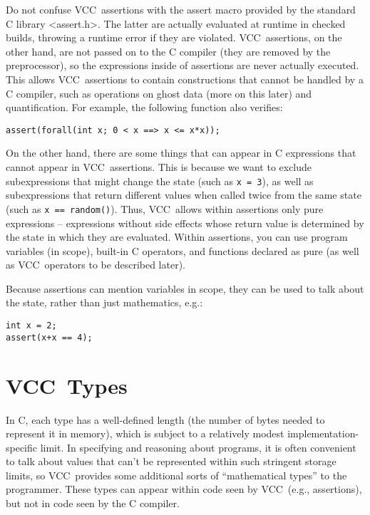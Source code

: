 \documentclass{report}
\newcommand{\Q}[1]{\lstinline~#1~}
\newcommand{\VCC}{VCC}
\begin{document}
Do not confuse \VCC\ assertions with the assert macro provided by the
standard C library <assert.h>. The latter are actually evaluated at
runtime in checked builds, throwing a runtime error if they are
violated. \VCC\ assertions, on the other hand, are not passed on to the
C compiler (they are removed by the preprocessor), so the expressions
inside of assertions are never actually executed. This allows \VCC\
assertions to contain constructions that cannot be handled by a C
compiler, such as operations on ghost data (more on this later) and
quantification. For example, the following function also verifies:
\begin{lstlisting}
assert(forall(int x; 0 < x ==> x <= x*x));
\end{lstlisting}

On the other hand, there are some things that can appear in C
expressions that cannot appear in \VCC\ assertions. This is because we
want to exclude subexpressions that might change the state (such as \Q{x
= 3}), as well as subexpressions that return different values when
called twice from the same state (such as \Q{x == random()}). Thus, \VCC\
allows within assertions only pure expressions -- expressions without
side effects whose return value is determined by the state in which
they are evaluated. Within assertions, you can use program variables
(in scope), built-in C operators, and functions declared as pure (as
well as \VCC\ operators to be described later).

Because assertions can mention variables in scope, they can be used to
talk about the state, rather than just mathematics, e.g.:

\begin{lstlisting}
int x = 2;
assert(x+x == 4);
\end{lstlisting}

\section{\VCC\ Types}

In C, each type has a well-defined length (the number of bytes needed
to represent it in memory), which is subject to a relatively modest
implementation-specific limit. In specifying and reasoning about
programs, it is often convenient to talk about values that can't be
represented within such stringent storage limits, so \VCC\ provides some
additional sorts of ``mathematical types'' to the programmer. These
types can appear within code seen by \VCC\ (e.g., assertions), but not
in code seen by the C compiler.
\end{document}
